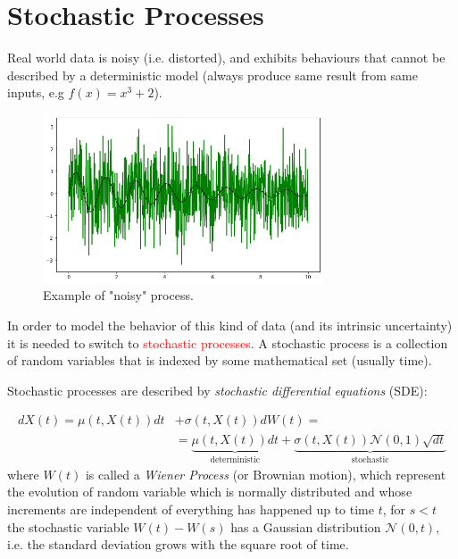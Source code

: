 \documentclass[12pt,a4paper]{book}
\begin{document}
\section{Stochastic Processes}
Real world data is noisy (i.e. distorted), and exhibits behaviours that cannot be described by a deterministic model (always produce same result from same inputs, e.g $f(x)=x^3+2$).
\begin{figure}[htbp]
	\begin{center}  
	\includegraphics[height=5cm]{stochastic_process}
	\end{center}
\caption{Example of "noisy" process.}
\end{figure}

In order to model the behavior of this kind of data (and its intrinsic uncertainty) it is needed to switch to \textcolor{red}{stochastic processes}.  
A stochastic process is a collection of random variables that is indexed by some mathematical set (usually time).

Stochastic processes are described by \emph{stochastic differential equations} (SDE):
	
\begin{equation}
\begin{aligned}
	dX(t) = \mu(t,X(t)) dt &+ \sigma(t,X(t)) dW(t) =\\  & =\underbrace{\mu(t,X(t))dt}_{\textrm{deterministic}} + \underbrace{\sigma(t,X(t)) \mathcal{N}(0,1)\sqrt{dt}}_{\textrm{stochastic}}
\end{aligned}
\label{eq:sde}
\end{equation}
where $W(t)$ is called a \emph{Wiener Process} (or Brownian motion), which represent the evolution of random variable which is normally distributed and whose increments are independent of everything has happened up to time $t$, for $s< t$ the stochastic variable $W(t)-W(s)$ has a Gaussian distribution $\mathcal{N}(0, t)$, i.e. the standard deviation grows with the square root of time.
\end{document}
